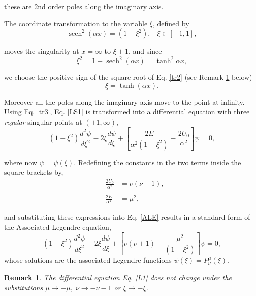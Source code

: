 \documentclass{article}
\DeclareMathOperator{\sech}{sech}
\newtheorem{remark}{Remark}
\numberwithin{equation}{section}
\begin{document}
these are 2nd order poles along the imaginary axis.

The coordinate transformation to the variable $\xi$, defined by
\begin{equation}
\sech^2{(\alpha x)}=\left(1-\xi^2\right),\;\;\;\xi\in\left[-1,1\right],\label{tr1}
\end{equation}

moves the singularity at $x=\infty$ to $\xi\pm1$, and since
\begin{equation}
\xi^2=1-\sech^2{(\alpha x)}=\tanh^2{\alpha x},\label{tr2}
\end{equation}

we choose the positive sign of the square root of Eq. \eqref{tr2} (see Remark \ref{symmetries} below)
\begin{equation}
\xi=\tanh{(\alpha x)}.\label{tr3}
\end{equation}

Moreover all the poles along the imaginary axis move to the point at infinity.  Using Eq. \eqref{tr3}, Eq. \eqref{LS1} is transformed into a differential equation with three \textit{regular} singular points at $(\pm1, \infty)$,
\begin{equation}
\left(1-\xi^2\right)\frac{d^{2}\psi}{d\xi^2}-2\xi\frac{d\psi}{d\xi}+\left[\frac{2E}{\alpha^2\left(1-\xi^2\right)}-\frac{2U_0}{\alpha^2}\right]\psi=0,\label{ALE}
\end{equation}

where now $\psi=\psi(\xi)$. Redefining the constants in the two terms inside the square brackets by,
\begin{align}
-\frac{2U_0}{\alpha^2}&=\nu(\nu+1),\label{nu}\\\nonumber\\
-\frac{2E}{\alpha^2}&=\mu^2,\label{mu}
\end{align}

and substituting these expressions into Eq. \eqref{ALE} results in a standard form of the Associated Legendre  equation, 
\begin{equation}
\left(1-\xi^2\right)\frac{d^{2}\psi}{d\xi^2}-2\xi\frac{d\psi}{d\xi}+\left[\nu(\nu+1)-\frac{\mu^2}{\left(1-\xi^2\right)}\right]\psi=0,\label{L1}
\end{equation}
whose solutions are the associated Legendre functions $\psi(\xi)=P^{\mu}_{\nu}(\xi)$.\\

\begin{remark}\label{symmetries}
The differential equation Eq. \eqref{L1} does not change under the substitutions $\mu\to -\mu,\;\nu\to -\nu-1$ or $\xi\to -\xi$. 
\end{remark}
\end{document}
